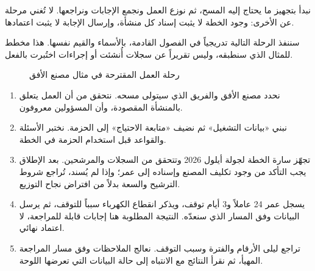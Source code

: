 نبدأ بتجهيز ما يحتاج إليه المسح، ثم نوزع العمل ونجمع الإجابات ونراجعها. لا تُغني مرحلة عن الأخرى: وجود الخطة لا يثبت إسناد كل منشأة، وإرسال الإجابة لا يثبت اعتمادها.

\begin{rcnote}
سننفذ الرحلة التالية تدريجياً في الفصول القادمة، بالأسماء والقيم نفسها. هذا مخطط للمثال الذي سنطبقه، وليس تقريراً عن سجلات أُنشئت أو إجراءات اختُبرت بالفعل.
\end{rcnote}

\begin{figure}[H]
\centering
{}
\caption{رحلة العمل المقترحة في مثال مصنع الأفق}
\label{fig:observatory-journey}
\end{figure}

\begin{enumerate}
\item نحدد مصنع الأفق والفريق الذي سيتولى مسحه. نتحقق من أن العمل يتعلق بالمنشأة المقصودة، وأن المسؤولين معروفون.
\item نبني «بيانات التشغيل» ثم نضيف «متابعة الاحتياج» إلى الحزمة. نختبر الأسئلة والقواعد قبل استخدام الحزمة في الخطة.
\item تجهّز سارة الخطة لجولة أيلول 2026 وتتحقق من السجلات والمرشحين. بعد الإطلاق يجب التأكد من وجود تكليف المصنع وإسناده إلى عمر؛ وإذا لم يُسند، تُراجع شروط الترشيح والسعة بدلاً من افتراض نجاح التوزيع.
\item يسجل عمر 24 عاملاً و3 أيام توقف، ويذكر انقطاع الكهرباء سبباً للتوقف، ثم يرسل البيانات وفق المسار الذي سنعدّه. النتيجة المطلوبة هنا إجابات قابلة للمراجعة، لا اعتماد نهائي.
\item تراجع ليلى الأرقام والفترة وسبب التوقف. نعالج الملاحظات وفق مسار المراجعة المهيأ، ثم نقرأ النتائج مع الانتباه إلى حالة البيانات التي تعرضها اللوحة.
\end{enumerate}

